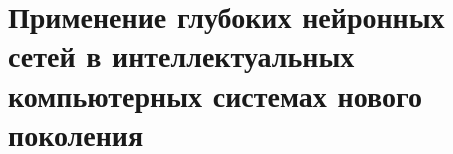 \chapter{Применение глубоких нейронных сетей в интеллектуальных компьютерных системах нового поколения}
\label{chapter_deep_ann}


%